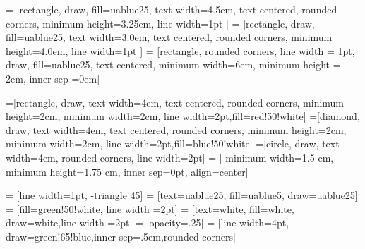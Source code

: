  = [rectangle, draw, fill=uablue25,
    text width=4.5em, text centered, rounded corners, minimum height=3.25em, line width=1pt ]
 = [rectangle, draw, fill=uablue25,
    text width=3.0em, text centered, rounded corners, minimum height=4.0em, line width=1pt ]
 = [rectangle, rounded corners, line width = 1pt, draw, fill=uablue25, text centered, minimum width=6em, minimum height = 2em, inner sep =0em]

 =[rectangle, draw, text width=4em, text centered, rounded corners, minimum height=2cm, minimum width=2cm, line width=2pt,fill=red!50!white]
 =[diamond, draw, text width=4em, text centered, rounded corners, minimum height=2cm, minimum width=2cm, line width=2pt,fill=blue!50!white]
 =[circle, draw, text width=4em, rounded corners, line width=2pt]
 = [
    minimum width=1.5 cm, minimum height=1.75 cm,
    inner sep=0pt,
    align=center]

 = [line width=1pt, -triangle 45]
 = [text=uablue25, fill=uablue5, draw=uablue25]
 = [fill=green!50!white, line width =2pt]
 = [text=white, fill=white, draw=white,line width =2pt]
 = [opacity=.25]
 = [line width=4pt, draw=green!65!blue,inner sep=.5em,rounded corners]


